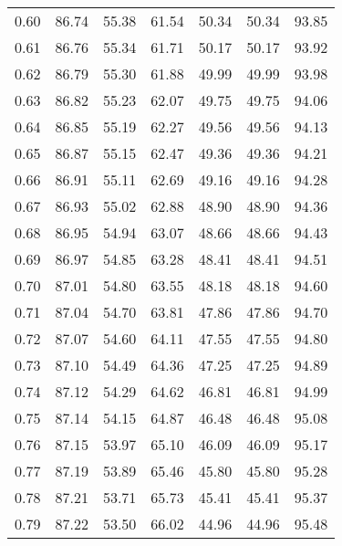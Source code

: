 \begin{tabular}{|c|c|c|c|c|c|c|}
      0.60 &     86.74 &     55.38 &      61.54 &   50.34 &      50.34 &         93.85 \\
      0.61 &     86.76 &     55.34 &      61.71 &   50.17 &      50.17 &         93.92 \\
      0.62 &     86.79 &     55.30 &      61.88 &   49.99 &      49.99 &         93.98 \\
      0.63 &     86.82 &     55.23 &      62.07 &   49.75 &      49.75 &         94.06 \\
      0.64 &     86.85 &     55.19 &      62.27 &   49.56 &      49.56 &         94.13 \\
      0.65 &     86.87 &     55.15 &      62.47 &   49.36 &      49.36 &         94.21 \\
      0.66 &     86.91 &     55.11 &      62.69 &   49.16 &      49.16 &         94.28 \\
      0.67 &     86.93 &     55.02 &      62.88 &   48.90 &      48.90 &         94.36 \\
      0.68 &     86.95 &     54.94 &      63.07 &   48.66 &      48.66 &         94.43 \\
      0.69 &     86.97 &     54.85 &      63.28 &   48.41 &      48.41 &         94.51 \\
      0.70 &     87.01 &     54.80 &      63.55 &   48.18 &      48.18 &         94.60 \\
      0.71 &     87.04 &     54.70 &      63.81 &   47.86 &      47.86 &         94.70 \\
      0.72 &     87.07 &     54.60 &      64.11 &   47.55 &      47.55 &         94.80 \\
      0.73 &     87.10 &     54.49 &      64.36 &   47.25 &      47.25 &         94.89 \\
      0.74 &     87.12 &     54.29 &      64.62 &   46.81 &      46.81 &         94.99 \\
      0.75 &     87.14 &     54.15 &      64.87 &   46.48 &      46.48 &         95.08 \\
      0.76 &     87.15 &     53.97 &      65.10 &   46.09 &      46.09 &         95.17 \\
      0.77 &     87.19 &     53.89 &      65.46 &   45.80 &      45.80 &         95.28 \\
      0.78 &     87.21 &     53.71 &      65.73 &   45.41 &      45.41 &         95.37 \\
      0.79 &     87.22 &     53.50 &      66.02 &   44.96 &      44.96 &         95.48 \\

\end{tabular}
